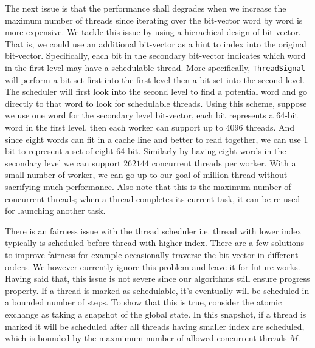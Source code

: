 The next issue is that the performance shall degrades when we increase the
maximum number of threads since iterating over the bit-vector word by word is
more expensive. We tackle this issue by using a hierachical design of
bit-vector.  That is, we could use an additional bit-vector as a hint to index
into the original bit-vector. Specifically, each bit in the secondary
bit-vector indicates which word in the first level may have a schedulable
thread. More specifically, \texttt{ThreadSignal} will perform a bit set first
into the first level then a bit set into the second level. The scheduler will
first look into the second level to find a potential word and go directly to
that word to look for schedulable threads. %
Using this scheme, suppose we use one word for the secondary level bit-vector,
each bit represents a 64-bit word in the first level, then each worker can
support up to $4096$ threads. And since eight words can fit in a cache line and
better to read together, we can use 1 bit to represent a set of eight 64-bit.
Similarly by having eight words in the secondary level we can support $262144$
concurrent threads per worker. With a small number of worker, we can go up to
our goal of million thread without sacrifying much performance. Also note that
this is the maximum number of concurrent threads; when a thread completes its
current task, it can be re-used for launching another task.

There is an fairness issue with the thread scheduler i.e. thread with lower
index typically is scheduled before thread with higher index. There are a few
solutions to improve fairness for example occasionally traverse the bit-vector
in different orders. We however currently ignore this problem and leave it for
future works. Having said that, this issue is not severe since our algorithms
still ensure progress property. If a thread is marked as schedulable, it's
eventually will be scheduled in a bounded number of steps. To show that this is
true, consider the atomic exchange as taking a snapshot of the global state. In
this snapshot, if a thread is marked it will be scheduled after all threads
having smaller index are scheduled, which is bounded by the maxmimum number of
allowed concurrent threads $M$.

